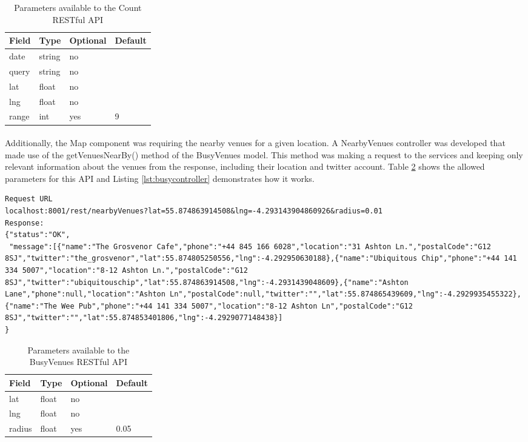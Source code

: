 \documentclass{l4proj}
\begin{document}
\begin{table}[H]
	\centering
	\begin{tabular}{|l|l|l|l|} \hline
		Field	&	Type	& Optional & Default\\ \hline
		date 	& string & no  & \\ \hline
		query 	& string & no  & \\ \hline
		lat 	& float & no  & \\ \hline
		lng 	& float & no  & \\ \hline
		range 	& int & yes  & 9\\ \hline
	\end{tabular}
	\caption{Parameters available to the Count RESTful API}
	\label{tab:countapi}
\end{table}

\paragraph{}
Additionally, the Map component was requiring the nearby venues for a given location. A NearbyVenues controller was developed that made use of the getVenuesNearBy() method of the BusyVenues model. This method was making a request to the services and keeping only relevant information about the venues from the response, including their location and twitter account. Table \ref{tab:venueapi} shows the allowed parameters for this API and Listing \ref{lst:busycontroller} demonstrates how it works.

\begin{lstlisting}[caption={Busy Venues API Request and Response},label={lst:busycontroller}]
Request URL
localhost:8001/rest/nearbyVenues?lat=55.874863914508&lng=-4.293143904860926&radius=0.01
Response:
{"status":"OK",
 "message":[{"name":"The Grosvenor Cafe","phone":"+44 845 166 6028","location":"31 Ashton Ln.","postalCode":"G12 8SJ","twitter":"the_grosvenor","lat":55.874805250556,"lng":-4.292950630188},{"name":"Ubiquitous Chip","phone":"+44 141 334 5007","location":"8-12 Ashton Ln.","postalCode":"G12 8SJ","twitter":"ubiquitouschip","lat":55.874863914508,"lng":-4.2931439048609},{"name":"Ashton Lane","phone":null,"location":"Ashton Ln","postalCode":null,"twitter":"","lat":55.874865439609,"lng":-4.2929935455322},{"name":"The Wee Pub","phone":"+44 141 334 5007","location":"8-12 Ashton Ln","postalCode":"G12 8SJ","twitter":"","lat":55.874853401806,"lng":-4.2929077148438}]
}
\end{lstlisting}
\begin{table}[H]
	\centering
	\begin{tabular}{|l|l|l|l|} \hline
		Field	&	Type	& Optional & Default\\ \hline
		lat 	& float & no  & \\ \hline
		lng 	& float & no  & \\ \hline
		radius 	& float & yes  & 0.05\\ \hline
	\end{tabular}
	\caption{Parameters available to the BusyVenues RESTful API}
	\label{tab:venueapi}
\end{table}
\end{document}
